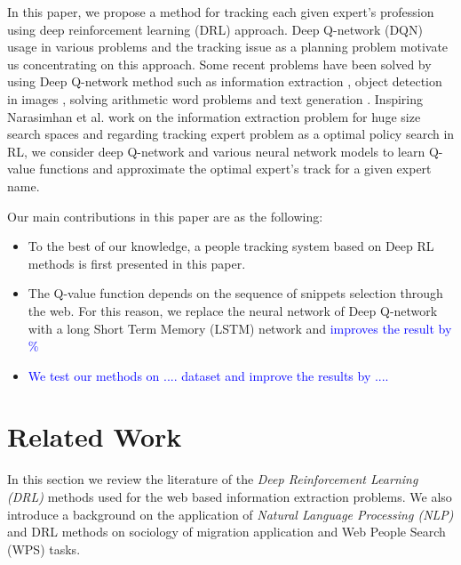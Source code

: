 \documentclass[11pt,a4paper]{article}
\newcommand{\PA}[1]{{\textcolor{blue}{#1}}}
\begin{document}
In this paper, we propose a method for tracking each given expert's profession using deep reinforcement learning (DRL) approach. Deep Q-network (DQN) usage in various problems and the tracking issue as a planning problem motivate us concentrating on this approach. Some recent problems have been solved by using Deep Q-network method such as information extraction \citep{narasimhan2016improving}, object detection in images \cite{Caicedo2015}, solving arithmetic word problems \cite{wang2018} and text generation \citep{Guo2015}. Inspiring Narasimhan et al.  work on the information extraction problem for huge size search spaces and regarding tracking expert problem as a optimal policy search in RL, we consider deep Q-network and various neural network models to learn Q-value functions and approximate the optimal expert's track for a given expert name.  

Our main contributions in this paper are as the following:
\begin{itemize}
\item To the best of our knowledge, a people tracking system based on Deep RL methods is first presented in this paper.
\item The Q-value function depends on the sequence of snippets selection through the web. For this reason, we replace the neural network of Deep Q-network \cite{mnih2015} with a long Short Term Memory (LSTM) network and \PA{improves the result by \%  }
\item \PA{We test our methods on .... dataset and improve the results by .... }
\end{itemize}




\section{Related Work}

In this section we review the literature of the \textit{Deep Reinforcement Learning (DRL)} methods used for the web based information extraction problems. We also introduce a background on the application of \textit{Natural Language Processing (NLP)} and DRL methods on sociology of migration application and Web People Search (WPS) tasks. 
\end{document}
